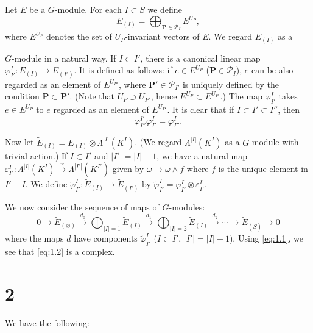 \documentclass[10pt,a4paper]{article}
\theoremstyle{plain}
\theoremstyle{definition}
\theoremstyle{remark}
\newcommand{\cP}{\mathcal{P}}
\newcommand{\bP}{\mathbf{P}}
\begin{document}
Let $E$ be a $G$-module. For each $I \subset \bar S$ we define
\begin{equation*}
E_{(I)} = \bigoplus_{\bP \in \cP_I} E^{U_P},
\end{equation*}
where $E^{U_P}$ denotes the set of $U_P$-invariant vectors of $E$. We regard $E_{(I)}$ as a

\newpage
\noindent $G$-module in a natural way. If $I \subset I'$, there is a canonical linear map $\varphi_{I'}^{I} \colon E_{(I)} \to E_{(I')}$. It is defined as follows: if $e \in E^{U_P}$ ($\bP \in \cP_I$), $e$ can be also regarded as an element of $E^{U_{P'}}$, where $\bP' \in \cP_{I'}$ is uniquely defined by the condition $\bP \subset \bP'$. (Note that $U_P \supset U_{P'}$, hence $E^{U_P} \subset E^{U_{P'}}$.)
The map $\varphi_{I'}^{I}$ takes $e \in E^{U_P}$ to $e$ regarded as an element of $E^{U_{P'}}$. It is clear that if $I \subset I' \subset I''$, then
\begin{equation}\tag{1.1}\label{eq:1.1}
\varphi_{I''}^{I'} \varphi_{I'}^{I} = \varphi_{I''}^{I}.
\end{equation}

Now let $\tilde{E}_{(I)} = E_{(I)} \otimes \Lambda^{|I|}(K^I)$. (We regard $\Lambda^{|I|}(K^I)$ as a $G$-module with trivial action.) If $I \subset I'$ and $|I'| = |I| + 1$, we have a natural map $\varepsilon_{I'}^{I} \colon \Lambda^{|I|}(K^I) \xrightarrow{\;\sim\;} \Lambda^{|I'|}(K^{I'})$ given by $\omega \mapsto \omega \wedge f$ where $f$ is the unique element in $I' - I$. We define $\widetilde\varphi_{I'}^{I} \colon \tilde{E}_{(I)} \to \tilde{E}_{(I')}$ by $\widetilde\varphi_{I'}^{I} = \varphi_{I'}^{I} \otimes \varepsilon_{I'}^{I}$.

We now consider the sequence of maps of $G$-modules:
\begin{equation}\tag{1.2}\label{eq:1.2}
0 \to \tilde{E}_{(\varnothing)} \xrightarrow{d_0} \bigoplus_{|I|=1} \tilde{E}_{(I)} \xrightarrow{d_1} \bigoplus_{|I|=2} \tilde{E}_{(I)} \xrightarrow{d_2} \cdots \to \tilde{E}_{(\bar S)} \to 0
\end{equation}
where the maps $d$ have components $\widetilde\varphi_{I'}^{I}$ ($I \subset I'$, $|I'| = |I|+1$). Using \eqref{eq:1.1}, we see that \eqref{eq:1.2} is a complex.

\section*{2}

We have the following:
\end{document}
